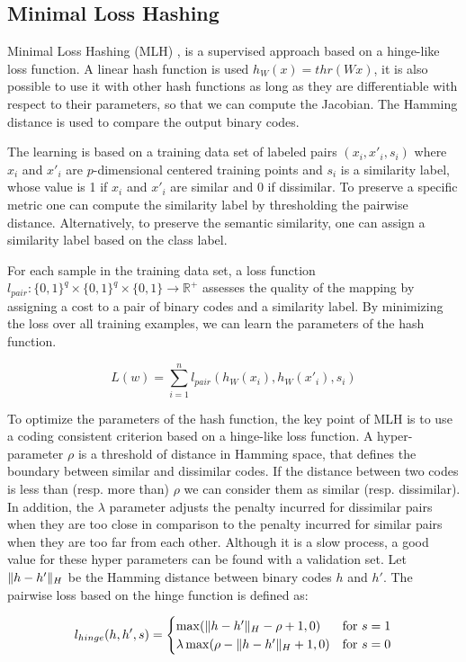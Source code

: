 \subsection{Minimal Loss Hashing}
Minimal Loss Hashing (MLH) \cite{norouzi2011minimal},\cite{norouzi2016} is a supervised approach based on a hinge-like loss function. A linear hash function is used $h_W(x)=thr(Wx)$, it is also possible to use it with other hash functions as long as they are differentiable with respect to their parameters, so that we can compute the Jacobian. The Hamming distance is used to compare the output binary codes.

The learning is based on a training data set of labeled pairs $(x_i, x'_i, s_i)$ where $x_i$ and $x'_i$ are $p$-dimensional centered training points and $s_i$ is a similarity label, whose value is 1 if $x_i$ and $x'_i$ are similar and 0 if dissimilar. To preserve a specific metric one can compute the similarity label by thresholding the pairwise distance. Alternatively, to preserve the semantic similarity, one can assign a similarity label based on the class label.

For each sample in the training data set, a loss function $l_{pair}: \{0, 1\}^{q}\times\{0, 1\}^{q}\times\{0, 1\}\rightarrow\mathbb{R}^{+}$ assesses the quality of the mapping by assigning a cost to a pair of binary codes and a similarity label. By minimizing the loss over all training examples, we can learn the parameters of the hash function.

\[L(w)=\sum\limits_{i=1}^n l_{pair}(h_W(x_i), h_W(x'_i), s_i)\]

To optimize the parameters of the hash function, the key point of MLH is to use a coding consistent criterion based on a hinge-like loss function. A hyper-parameter $\rho$ is a threshold of distance in Hamming space, that defines the boundary between similar and dissimilar codes. If the distance between two codes is less than (resp. more than) $\rho$ we can consider them as similar (resp. dissimilar). In addition, the $\lambda$ parameter adjusts the penalty incurred for dissimilar pairs when they are too close in comparison to the penalty incurred for similar pairs when they are too far from each other. Although it is a slow process, a good value for these hyper parameters can be found with a validation set. Let $\lVert h - h'\rVert_{H}$ be the Hamming distance between binary codes $h$ and $h'$. The pairwise loss based on the hinge function is defined as:

\[
	l_{hinge}(h, h', s)=
	\begin{cases}
	\max(\lVert h - h'\rVert_{H} - \rho + 1, 0) & \text{for } s=1 \\
	\lambda\max(\rho - \lVert h - h'\rVert_{H} + 1, 0) & \text{for } s=0
	\end{cases}
\]

